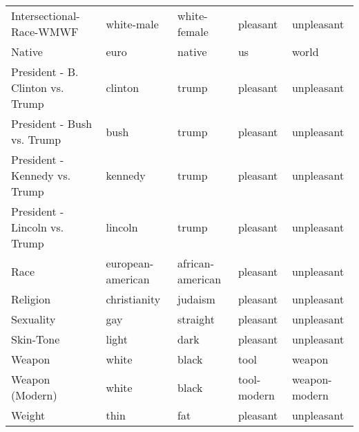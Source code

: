 \begin{tabular}{lllll}
Intersectional-Race-WMWF           &         white-male &      white-female &     pleasant &     unpleasant \\
Native                             &               euro &            native &           us &          world \\
President - B. Clinton vs. Trump   &            clinton &             trump &     pleasant &     unpleasant \\
President - Bush vs. Trump         &               bush &             trump &     pleasant &     unpleasant \\
President - Kennedy vs. Trump      &            kennedy &             trump &     pleasant &     unpleasant \\
President - Lincoln vs. Trump      &            lincoln &             trump &     pleasant &     unpleasant \\
Race                               &  european-american &  african-american &     pleasant &     unpleasant \\
Religion                           &       christianity &           judaism &     pleasant &     unpleasant \\
Sexuality                          &                gay &          straight &     pleasant &     unpleasant \\
Skin-Tone                          &              light &              dark &     pleasant &     unpleasant \\
Weapon                             &              white &             black &         tool &         weapon \\
Weapon (Modern)                    &              white &             black &  tool-modern &  weapon-modern \\
Weight                             &               thin &               fat &     pleasant &     unpleasant \\
\bottomrule
\end{tabular}
